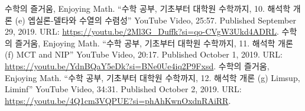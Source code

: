 \documentclass[11pt,openany]{article}
\begin{document}
\vfill
%
\begin{thebibliography}{9}
	수학의 즐거움, Enjoying Math. ``수학 공부, 기초부터 대학원 수학까지, 10. 해석학 개론 (e) 엡실론-델타와 수열의 수렴성'' YouTube Video, 25:57. Published 
	September 29, 2019. URL: \url{https://youtu.be/2Ml3G_Duffk?si=qo-CVgW3Ukd4ADRL}.
	수학의 즐거움, Enjoying Math. ``수학 공부, 기초부터 대학원 수학까지, 11. 해석학 개론 (f) MCT and NIP'' YouTube Video, 20:17. Published 
	October 1, 2019. URL: \url{https://youtu.be/YdnBQaY5eDk?si=BNe0Ue4iq2P9Fxsd}.
	수학의 즐거움, Enjoying Math. ``수학 공부, 기초부터 대학원 수학까지, 12. 해석학 개론 (g) Limsup, Liminf'' YouTube Video, 34:31. Published 
	October 2, 2019. URL: \url{https://youtu.be/4Q1cm3VQPUE?si=phAhKwnOxdnRAiRR}.
\end{thebibliography}

\newpage
\appendix
\end{document}
